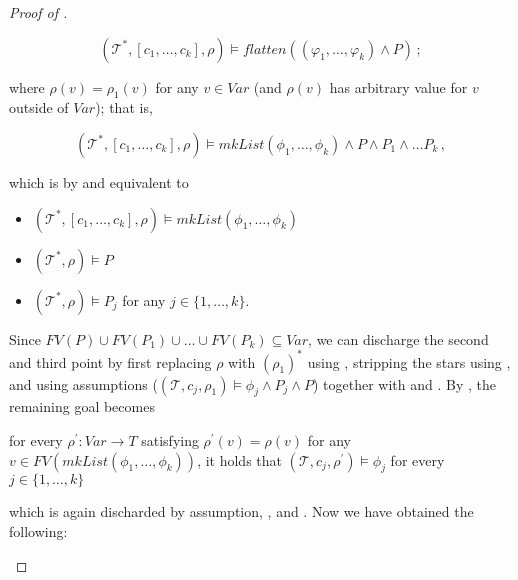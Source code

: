 \begin{proof}[Proof of ]
\begin{enumerate}
\begin{proofenv}
        \begin{equation*}
            (\mathcal{T}^*, [c_1,\ldots,c_k], \rho) \vDash \mathit{flatten}((\varphi_1,\ldots,\varphi_k) \land P) \, ;
        \end{equation*}
    \end{proofenv}
    where $\rho(v) = \rho_1(v)$ for any $v \in \mathit{Var}$ (and $\rho(v)$ has arbitrary value for $v$ outside of $\mathit{Var}$);
    that is,
    \begin{proofenv}
        \begin{equation*}
            (\mathcal{T}^*, [c_1,\ldots,c_k], \rho) \vDash \mathit{mkList}(\phi_1,\ldots,\phi_k) \land P \land P_1 \land \ldots P_k \, ,
        \end{equation*}
    \end{proofenv}
    which is by  and  equivalent to
    \begin{proofenv}
        \begin{itemize}
            \item $(\mathcal{T}^*, [c_1,\ldots,c_k], \rho) \vDash \mathit{mkList}(\phi_1,\ldots,\phi_k)$
            \item $(\mathcal{T}^*, \rho) \vDash P$
            \item $(\mathcal{T}^*, \rho) \vDash P_j$ for any $j \in \{ 1, \ldots, k \} $.
        \end{itemize}
    \end{proofenv}
    Since $\mathit{FV}(P) \cup \mathit{FV}(P_1) \cup \ldots \cup \mathit{FV}(P_k) \subseteq \mathit{Var}$,
    we can discharge the second and third point by first replacing $\rho$ with $(\rho_1)^*$
    using ,
    stripping the stars using , and using assumptions
    ($(\mathcal{T}, c_j, \rho_1) \vDash \phi_j \land P_j \land P$)
    together with  and .
    By , the remaining goal becomes
    \begin{proofenv}
        for every $\rho^\prime : \mathit{Var} \to \mathit{T}$ satisfying
        $\rho^\prime(v) = \rho(v)$ for any $v \in \mathit{FV}(\mathit{mkList}(\phi_1,\ldots,\phi_k))$,
        it holds that $(\mathcal{T}, c_j, \rho^\prime) \vDash \phi_j$
        for every $j \in \{ 1, \ldots, k \}$
    \end{proofenv}
    which is again discharded by assumption, , and .
    Now we have obtained the following:

\end{enumerate}
\end{proof}
